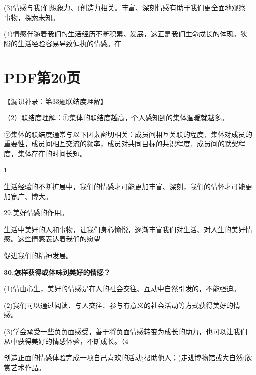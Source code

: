 \documentclass[lang=cn,11pt]{elegantbook}
\newcommand{\daofasym}[1]{{\daofasymbolfont #1}}
\newcommand{\daofasym}[1]{#1}
\begin{document}
(3)情感与我(们想象力、(创造力相关。丰富、深刻情感有助于我们更全面地观察事物，探索未知。\par

(4)情感伴随着我们的生活经历不断积累、发展，这正是我们生命成长的体现。狭隘的生活经验容易导致偏执的情感。在\par


\section*{PDF第20页}

【漏识补录：第33题联结度理解】\par

（2）联结度理解：\daofasym{①}集体的联结度越高，个人感知到的集体温暖就越多。\par

\daofasym{②}集体的联结度通常与以下因素密切相关：成员间相互关联的程度，集体对成员的重要性，成员间相互交流的频率，成员对共同目标的共识程度，成员间的默契程度，集体存在的时间长短。\par

1\par

生活经验的不断扩展中，我们的情感才可能更加丰富、深刻，我们的情怀才可能更加宽广、博大。\par

29.美好情感的作用。\par

生活中美好的人和事物，让我们身心愉悦，逐渐丰富我们对生活、对人生的美好情感。这些情感表达着我们的愿望\par

促进我们的精神发展。\par

\textbf{30.怎样获得或体味到美好的情感？}\par

(1)情由心生，美好的情感是在人的社会交往、互动中自然引发的，不能强迫。\par

(2)我们可以通过阅读、与人交往、参与有意义的社会活动等方式获得美好的情感。\par

(3)学会承受一些负负面感受，善于将负面情感转变为成长的助力，也可以让我们从中获得美好的情感体验，不断成长。（4\par

创造正面的情感体验完成一项自己喜欢的活动;帮助他人；)走进博物馆或大自然;欣赏艺术作品。\par
\end{document}
